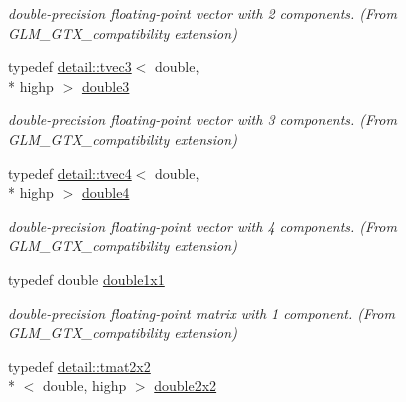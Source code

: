 \begin{DoxyCompactItemize}
\begin{DoxyCompactList}\small\item\em double-\/precision floating-\/point vector with 2 components. (From G\-L\-M\-\_\-\-G\-T\-X\-\_\-compatibility extension) \end{DoxyCompactList}\item 
\hypertarget{group__gtx__compatibility_ga3b94d4a19ca0272cad6e025fc5150d06}{typedef \hyperlink{structglm_1_1detail_1_1tvec3}{detail\-::tvec3}$<$ double, \\*
highp $>$ \hyperlink{group__gtx__compatibility_ga3b94d4a19ca0272cad6e025fc5150d06}{double3}}\label{group__gtx__compatibility_ga3b94d4a19ca0272cad6e025fc5150d06}

\begin{DoxyCompactList}\small\item\em double-\/precision floating-\/point vector with 3 components. (From G\-L\-M\-\_\-\-G\-T\-X\-\_\-compatibility extension) \end{DoxyCompactList}\item 
\hypertarget{group__gtx__compatibility_ga1edf736b418528a2fc87d826f7697b9d}{typedef \hyperlink{structglm_1_1detail_1_1tvec4}{detail\-::tvec4}$<$ double, \\*
highp $>$ \hyperlink{group__gtx__compatibility_ga1edf736b418528a2fc87d826f7697b9d}{double4}}\label{group__gtx__compatibility_ga1edf736b418528a2fc87d826f7697b9d}

\begin{DoxyCompactList}\small\item\em double-\/precision floating-\/point vector with 4 components. (From G\-L\-M\-\_\-\-G\-T\-X\-\_\-compatibility extension) \end{DoxyCompactList}\item 
\hypertarget{group__gtx__compatibility_ga1c87d3042377335eb050a20ab0ec148a}{typedef double \hyperlink{group__gtx__compatibility_ga1c87d3042377335eb050a20ab0ec148a}{double1x1}}\label{group__gtx__compatibility_ga1c87d3042377335eb050a20ab0ec148a}

\begin{DoxyCompactList}\small\item\em double-\/precision floating-\/point matrix with 1 component. (From G\-L\-M\-\_\-\-G\-T\-X\-\_\-compatibility extension) \end{DoxyCompactList}\item 
\hypertarget{group__gtx__compatibility_ga75cfac00b48c51f4b677151f789b8547}{typedef \hyperlink{structglm_1_1detail_1_1tmat2x2}{detail\-::tmat2x2}\\*
$<$ double, highp $>$ \hyperlink{group__gtx__compatibility_ga75cfac00b48c51f4b677151f789b8547}{double2x2}}\label{group__gtx__compatibility_ga75cfac00b48c51f4b677151f789b8547}


\end{DoxyCompactItemize}
